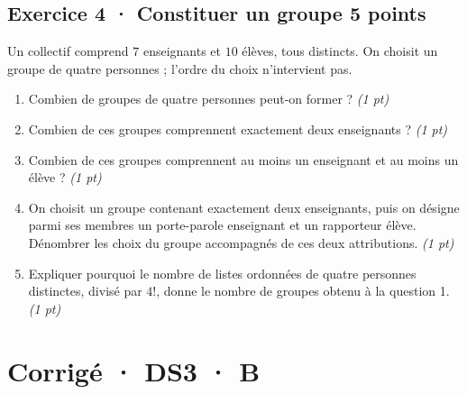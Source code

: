 \subsection*{Exercice 4 · Constituer un groupe \hfill 5 points}Un collectif comprend $7$ enseignants et $10$ élèves, tous distincts. On choisit un groupe de quatre personnes ; l'ordre du choix n'intervient pas.

\begin{enumerate}

\item Combien de groupes de quatre personnes peut-on former ? \hfill\textit{(1 pt)}

\item Combien de ces groupes comprennent exactement deux enseignants ? \hfill\textit{(1 pt)}

\item Combien de ces groupes comprennent au moins un enseignant et au moins un élève ? \hfill\textit{(1 pt)}

\item On choisit un groupe contenant exactement deux enseignants, puis on désigne parmi ses membres un porte-parole enseignant et un rapporteur élève. Dénombrer les choix du groupe accompagnés de ces deux attributions. \hfill\textit{(1 pt)}

\item Expliquer pourquoi le nombre de listes ordonnées de quatre personnes distinctes, divisé par $4!$, donne le nombre de groupes obtenu à la question 1. \hfill\textit{(1 pt)}

\end{enumerate}

\ifprof\clearpage

\section*{Corrigé · DS3 · B}\label{cor:4-4}

